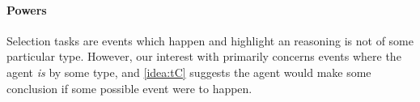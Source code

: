 


\paragraph*{Powers}

\begin{note}
  Selection tasks are events which happen and highlight an \agents{} reasoning is not of some particular type.
  However, our interest with \tCN{} primarily concerns events where the agent \emph{is} \tCV{} by some type, and \autoref{idea:tC} suggests the agent would make some conclusion if some possible event were to happen.
\end{note}

